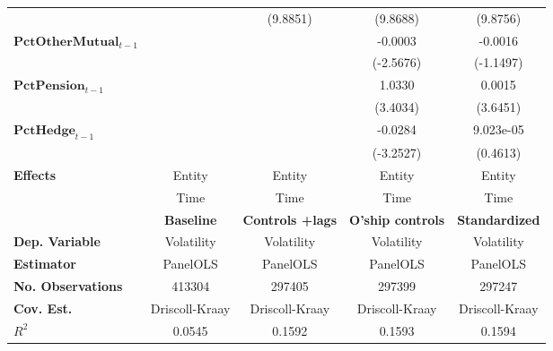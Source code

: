 {\begin{longtable}{>{\bfseries}lcccc}
                 &                    &            (9.8851)           &            (9.8688)            &        (9.8756)        \\
$\mathbf{PctOtherMutual}_{t-1}$    &                    &                               &            -0.0003             &        -0.0016         \\
                       &                    &                               &           (-2.5676)            &       (-1.1497)        \\
$\mathbf{PctPension}_{t-1}$        &                    &                               &             1.0330             &         0.0015         \\
                               &                    &                               &            (3.4034)            &        (3.6451)        \\
$\mathbf{PctHedge}_{t-1}$          &                    &                               &            -0.0284             &       9.023e-05        \\
                           &                    &                               &           (-3.2527)            &        (0.4613)        \\
\midrule
Effects                           &       Entity       &             Entity            &             Entity             &         Entity         \\
& Time &  Time  &  Time &  Time\\
\bottomrule
\pagebreak
\toprule
& \textbf{Baseline}  & \textbf{Controls +lags} & \textbf{O'ship controls} & \textbf{Standardized}  \\
\midrule
Dep. Variable                     &     Volatility     &           Volatility          &           Volatility           &       Volatility       \\
Estimator                         &      PanelOLS      &            PanelOLS           &            PanelOLS            &        PanelOLS        \\
No. Observations                  &       413304       &             297405            &             297399             &         297247         \\
Cov. Est.                         &   Driscoll-Kraay   &         Driscoll-Kraay        &         Driscoll-Kraay         &     Driscoll-Kraay     \\
$R^{2}$                         &       0.0545       &             0.1592            &             0.1593             &         0.1594         \\

\end{longtable}}
